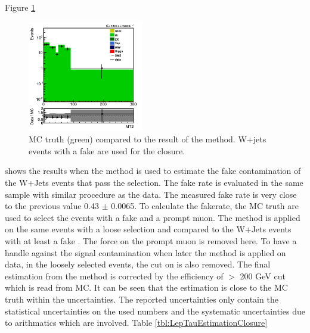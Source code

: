 Figure \ref{fig:LepTauClusure}
\begin{figure}[!Hhtb]
\centering
\includegraphics[width=0.45\textwidth,keepaspectratio=true]{FakeRateMuTau/Estimation_pfWJets_ExtraLepExcl_SameSignWeightedHiggs.png}
\caption{MC truth (green) compared to the result of the method. W+jets events with a fake \Tau are used for the closure.}
\label{fig:LepTauClusure}
\end{figure}
shows the results when the method is used to estimate the fake contamination of the W+Jets events that pass the selection. 
The fake rate is evaluated in the same sample with similar procedure as the data. The measured fake rate  is very close to
the previous value 0.43 $\pm$  0.0065. To calculate the fakerate, the MC truth are used to select the events with a fake \Tau 
and a prompt muon. The method is applied on the same events with a loose \Tau selection and compared to the W+Jets events with at least 
a fake \Tau. The force on the prompt muon is removed here. To have a handle against the signal contamination when later the method is applied 
on data, in the loosely selected events, the cut on \tauMT is also removed. The final estimation from the method is corrected by the efficiency 
of \tauMT $>$ 200 GeV cut which is read from MC. It can be seen that the estimation is close to the MC truth within the uncertainties.
The reported uncertainties only contain the statistical uncertainties on the used numbers and the systematic uncertainties due to arithmatics 
which are involved. Table \ref{tbl:LepTauEstimationClosure}
